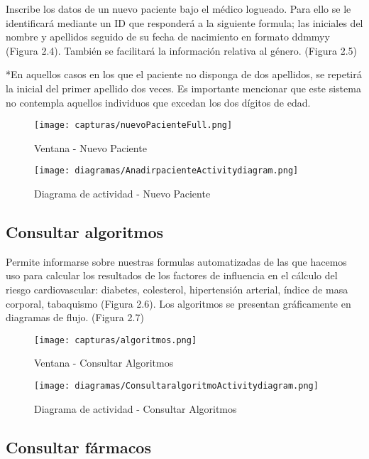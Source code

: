 \documentclass[11pt,spanish,
		listoftables,listoffigures]
		{tfgplantilla}
\begin{document}
Inscribe los datos de un nuevo paciente bajo el médico logueado. Para ello se le identificará mediante un ID que responderá a la siguiente formula; las iniciales del nombre y apellidos seguido de su fecha de nacimiento en formato ddmmyy (Figura 2.4). También se facilitará la información relativa al género. (Figura 2.5)

*En aquellos casos en los que el paciente no disponga de dos apellidos, se repetirá la inicial del primer apellido dos veces. Es importante mencionar que este sistema no contempla aquellos individuos que excedan los dos dígitos de edad.

\begin{figure}[H]
\centering
\texttt{[image: capturas/nuevoPacienteFull.png]}
\caption{Ventana - Nuevo Paciente}
\end{figure}

\begin{figure}[H]
\centering
\texttt{[image: diagramas/AnadirpacienteActivitydiagram.png]}
\caption{Diagrama de actividad - Nuevo Paciente}
\end{figure}

\subsection {Consultar algoritmos}

Permite informarse sobre nuestras formulas automatizadas de las que hacemos uso para calcular los resultados de los factores de influencia en el cálculo del riesgo cardiovascular: diabetes, colesterol, hipertensión arterial, índice de masa corporal, tabaquismo (Figura 2.6). Los algoritmos se presentan gráficamente en diagramas de flujo. (Figura 2.7)

\begin{figure}[H]
\centering
\texttt{[image: capturas/algoritmos.png]}
\caption{Ventana - Consultar Algoritmos}
\end{figure}

\begin{figure}[H]
\centering
\texttt{[image: diagramas/ConsultaralgoritmoActivitydiagram.png]}
\caption{Diagrama de actividad -  Consultar Algoritmos}
\end{figure}

\vfill
\subsection {Consultar fármacos}
\end{document}
